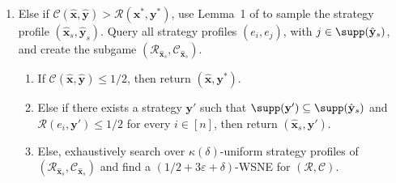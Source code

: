 \begin{algorithm}[H]
\begin{enumerate}[label=\arabic*.,leftmargin=1.8em,itemsep=0.18em,topsep=0.3em]
\begin{enumerate}[label=(\alph*),leftmargin=2.2em,itemsep=0.1em,topsep=0.1em]
        \item Else, exhaustively search over \(\kappa(\delta)\)-uniform strategy profiles of \((\mathcal{R}_{\mathbf{x}_s^*},\mathcal{C}_{\mathbf{x}_s^*})\) and find a \((1/2+3\varepsilon+\delta)\)-WSNE of \((\mathcal{R},\mathcal{C})\).
      \end{enumerate}
    \item Else if \(\mathcal{C}(\hat{\mathbf{x}},\hat{\mathbf{y}})>\mathcal{R}(\mathbf{x}^*,\mathbf{y}^*)\), use Lemma~1 of \cite{12WSNE} to sample the strategy profile \((\hat{\mathbf{x}}_s,\hat{\mathbf{y}}_s)\). Query all strategy profiles \((e_i,e_j)\), with \(j\in\supp(\hat{\mathbf{y}}_s)\), and create the subgame \((\mathcal{R}_{\hat{\mathbf{x}}_s},\mathcal{C}_{\hat{\mathbf{x}}_s})\).
      \begin{enumerate}[label=(\alph*),leftmargin=2.2em,itemsep=0.1em,topsep=0.1em]
        \item If \(\mathcal{C}(\hat{\mathbf{x}},\hat{\mathbf{y}})\leq 1/2\), then return \((\hat{\mathbf{x}},\mathbf{y}^*)\).
        \item Else if there exists a strategy \(\mathbf{y}'\) such that
        \(\supp(\mathbf{y}')\subseteq\supp(\hat{\mathbf{y}}_s)\) and
        \(\mathcal{R}(e_i,\mathbf{y}')\leq 1/2\) for every \(i\in[n]\), then return \((\hat{\mathbf{x}}_s,\mathbf{y}')\).
        \item Else, exhaustively search over \(\kappa(\delta)\)-uniform strategy profiles of \((\mathcal{R}_{\hat{\mathbf{x}}_s},\mathcal{C}_{\hat{\mathbf{x}}_s})\) and find a \((1/2+3\varepsilon+\delta)\)-WSNE for \((\mathcal{R},\mathcal{C})\).
      \end{enumerate}
  \end{enumerate}
\end{algorithm}

